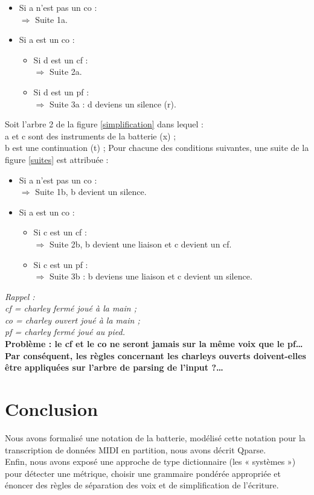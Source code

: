 \begin{itemize}
	\item Si a n’est pas un co :\\
	$\Rightarrow$ Suite 1a.
	\item Si a est un co :
	\begin{itemize}
		\item Si d est un cf :\\
		$\Rightarrow$ Suite 2a.
		\item Si d est un pf :\\
		$\Rightarrow$ Suite 3a : d deviens un silence (r).\\
	\end{itemize}
\end{itemize}
Soit l’arbre 2 de la figure \ref{simplification} dans lequel :\\
a et c sont des instruments de la batterie (x) ;\\
b est une continuation (t) ;
Pour chacune des conditions suivantes, une suite de la figure \ref{suites} est attribuée :
\begin{itemize}
	\item Si a n’est pas un co :\\
	$\Rightarrow$ Suite 1b, b devient un silence.
	\item Si a est un co :
	\begin{itemize}
		\item Si c est un cf :\\
		$\Rightarrow$ Suite 2b, b devient une liaison et c devient un cf.
		\item Si c est un pf :\\
		$\Rightarrow$ Suite 3b : b deviens une liaison et c devient un silence.\\
	\end{itemize}
\end{itemize}
\textit{Rappel :\\cf = charley fermé joué à la main ;\\co = charley ouvert joué à la main ;\\ pf = charley fermé joué au pied.}\\

\textbf{Problème : le cf et le co ne seront jamais sur la même voix que le pf… Par conséquent, les règles concernant les charleys ouverts doivent-elles être appliquées sur l’arbre de parsing de l’input ?…}

\section*{Conclusion}
Nous avons formalisé une notation de la batterie, modélisé cette notation pour la transcription de données MIDI en partition, nous avons décrit Qparse.\\
Enfin, nous avons exposé une approche de type dictionnaire (les « systèmes ») pour détecter une métrique, choisir une grammaire pondérée appropriée et énoncer des règles de séparation des voix et de simplification de l’écriture.